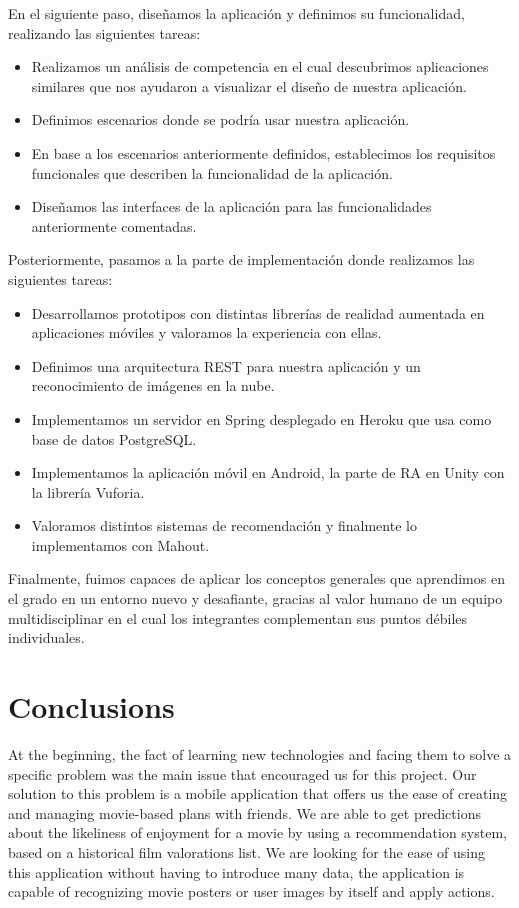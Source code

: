 En el siguiente paso, diseñamos la aplicación y definimos su funcionalidad,
 realizando las siguientes tareas:
\begin{itemize}
    \item Realizamos un análisis de competencia en el cual descubrimos
     aplicaciones similares que nos ayudaron a visualizar el diseño de nuestra
     aplicación.
    \item Definimos escenarios donde se podría usar nuestra aplicación.
    \item En base a los escenarios anteriormente definidos, establecimos los
     requisitos funcionales que describen la funcionalidad de la aplicación.
    \item Diseñamos las interfaces de la aplicación para las funcionalidades
     anteriormente comentadas.
\end{itemize}

Posteriormente, pasamos a la parte de implementación donde realizamos las
 siguientes tareas:
\begin{itemize}
    \item Desarrollamos prototipos con distintas librerías de realidad
     aumentada en aplicaciones móviles y valoramos la experiencia con ellas.
    \item Definimos una arquitectura REST para nuestra aplicación y un
     reconocimiento de imágenes en la nube.
    \item Implementamos un servidor en Spring desplegado en Heroku que usa como
     base de datos PostgreSQL.
    \item Implementamos la aplicación móvil en Android, la parte de RA en Unity
     con la librería Vuforia.
    \item Valoramos distintos sistemas de recomendación y finalmente lo
     implementamos con Mahout.
\end{itemize}

Finalmente, fuimos capaces de aplicar los conceptos generales que aprendimos
 en el grado en un entorno nuevo y desafiante, gracias al valor humano de
 un equipo multidisciplinar en el cual los integrantes complementan sus
 puntos débiles individuales. 

\section{Conclusions}
\label{makereference5.2}
At the beginning, the fact of learning new technologies and facing them
to solve a specific problem was the main issue that encouraged us for this project. 
Our solution to this problem is a mobile application that offers us the ease of 
creating and managing movie-based plans with friends. We are able to get predictions 
about the likeliness of enjoyment for a movie by using a recommendation system, based on 
a historical film valorations list. We are looking for the ease of using this application without 
having to introduce many data, the application is capable of recognizing movie posters or
user images by itself and apply actions.

